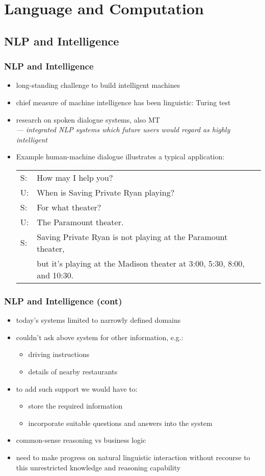 \documentclass{beamer}             %
\begin{document}
\section{Language and Computation}

\subsection{NLP and Intelligence}

\begin{frame}
\frametitle{NLP and Intelligence}
\begin{itemize}
\item long-standing challenge to build intelligent machines
\item chief measure of machine intelligence has been linguistic: Turing test
\item research on spoken dialogue systems, also MT\\
  \emph{--- integrated NLP systems which future users would regard as highly intelligent}
\item Example human-machine dialogue illustrates a typical application:
\small
\begin{tabular}{ll}
S: & How may I help you?\\
U: & When is Saving Private Ryan playing?\\
S: & For what theater?\\
U: & The Paramount theater.\\
S: & Saving Private Ryan is not playing at the Paramount theater,\\
   & but it's playing at the Madison theater at 3:00, 5:30, 8:00, and 10:30. 
\end{tabular}
\end{itemize}
\end{frame}

\begin{frame}
\frametitle{NLP and Intelligence (cont)}
\begin{itemize}
\item today's systems limited to narrowly defined domains
\item couldn't ask above system for other information, e.g.:
  \begin{itemize}
  \item driving instructions
  \item details of nearby restaurants
  \end{itemize}
\item to add such support we would have to:
  \begin{itemize}
  \item store the required information
  \item incorporate suitable questions and answers into the system
  \end{itemize}
\item common-sense reasoning vs business logic
\item need to make progress on natural linguistic interaction without
  recourse to this unrestricted knowledge and reasoning capability
\end{itemize}
\end{frame}
\end{document}
